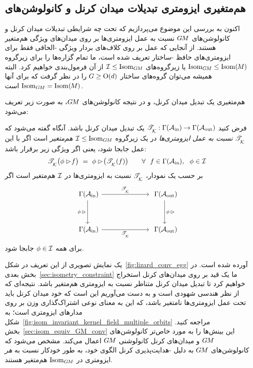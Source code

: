 

\subsection{هم‌متغیری ایزومتری تبدیلات میدان کرنل و کانولوشن‌های }
\label{sec:isometry_equivariance}


اکنون به بررسی این موضوع می‌پردازیم که تحت چه شرایطی تبدیلات میدان کرنل و کانولوشن‌های $G\mkern-1.4muM$ نسبت به عمل ایزومتری‌ها بر روی میدان‌های ویژگی هم‌متغیر هستند.
از آنجایی که عمل بر روی کلاف‌های بردار ویژگی -الحاقی فقط برای ایزومتری‌های حافظ -ساختار تعریف شده است، ما تمام گزاره‌ها را برای زیرگروه $\operatorname{Isom}_{G\mkern-1.4muM} \leq \operatorname{Isom}(\mkern-1.5mu M \mkern-.5mu)$ یا زیرگروه‌های $\mathcal{I} \leq \operatorname{Isom}_{G\mkern-1.4muM}$ از آن فرمول‌بندی خواهیم کرد.
البته همیشه می‌توان گروه‌های ساختار $G\geq\operatorname{O}(d)$ را در نظر گرفت که برای آنها $\operatorname{Isom}_{G\mkern-1.4muM} = \operatorname{Isom}(\mkern-1.5mu M \mkern-.5mu)$ است.


هم‌متغیری یک تبدیل میدان کرنل، و در نتیجه کانولوشن‌های $G\mkern-1.4muM$، به صورت زیر تعریف می‌شود:
\begin{dfn}
\label{dfn:isometry_equivariance}
    فرض کنید ${\mathscr{T}_{\overset{}{\mkern-0mu \mathcal{K}}}: \Gamma(\mathcal{A}_\textup{in}) \to \Gamma(\mathcal{A}_\textup{out})}$ یک تبدیل میدان کرنل باشد.
    آنگاه گفته می‌شود که $\mathscr{T}_{\overset{}{\mkern-0mu \mathcal{K}}}$ \emph{نسبت به عمل ایزومتری‌ها} در یک زیرگروه $\mathcal{I} \leq \operatorname{Isom}_{G\mkern-1.4muM}$ \emph{هم‌متغیر} است اگر با این عمل جابجا شود، یعنی اگر ویژگی زیر برقرار باشد:
    \begin{align}\label{eq:isom_equivariance_kernel_field_trafo_def}
        \mathscr{T}_{\overset{}{\mkern-0mu \mathcal{K}}} \big( \phi\rhd\!f \big) \ =\ \phi\rhd\! \big( \mathscr{T}_{\overset{}{\mkern-0mu \mathcal{K}}}(f) \big)
        \qquad \forall\ \ f\in\Gamma(\mathcal{A}_\textup{in}), \ \ \phi\in \mathcal{I}
    \end{align}
    بر حسب یک نمودار، $\mathscr{T}_{\overset{}{\mkern-0mu \mathcal{K}}}$ نسبت به ایزومتری‌ها در $\mathcal{I}$ هم‌متغیر است اگر
    \begin{equation}
    \begin{tikzcd}[column sep=70pt, row sep=35, font=\normalsize]
        \Gamma(\Ain)
            \arrow[r, "\TK"]
            \arrow[d, "\phi\,\rhd"']
        &
        \Gamma(\Aout)
            \arrow[d, "\phi\,\rhd"]
        \\
        \Gamma(\Ain)
            \arrow[r, "\TK"']
        &
        \Gamma(\Aout)
    \end{tikzcd}
    \end{equation}
    برای همه $\phi \in \mathcal{I}$ جابجا شود.
\end{dfn}
یک نمایش تصویری از این تعریف در شکل~\ref{fig:lizard_conv_egg} آورده شده است.
در بخش بعدی~\ref{sec:isometry_constraint} ما یک قید بر روی میدان‌های کرنل استخراج خواهیم کرد تا تبدیل میدان کرنل متناظر نسبت به ایزومتری هم‌متغیر باشد.
نتیجه‌ای که از نظر هندسی شهودی است و به دست می‌آوریم این است که خود میدان کرنل باید تحت عمل ایزومتری‌ها نامتغیر باشد، که این به معنای نوعی اشتراک‌گذاری وزن بر روی مدارهای ایزومتری است؛ به شکل~\ref{fig:isom_invariant_kernel_field_multiple_orbits} مراجعه کنید.
بخش~\ref{sec:isom_equiv_GM_conv} این بینش‌ها را به مورد خاص‌تر کانولوشن‌های $G\mkern-1.4muM$ و میدان‌های کرنل کانولوشنی $G\mkern-1.4muM$ اعمال می‌کند.
مشخص می‌شود که کانولوشن‌های $G\mkern-1.4muM$ به دلیل -هدایت‌پذیری کرنل الگوی خود، به طور خودکار نسبت به \emph{هر} ایزومتری در $\operatorname{Isom}_{G\mkern-1.4muM}$ هم‌متغیر هستند.









